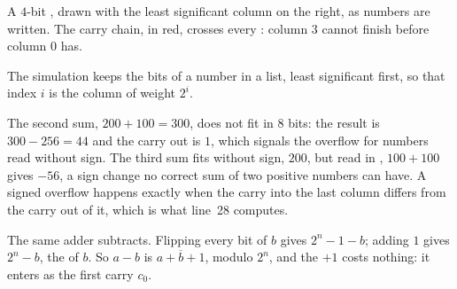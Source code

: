 \begin{omfigure}

{\small A $4$-bit , drawn with the least significant column on the right, as numbers are written.
The carry chain, in red, crosses every : column $3$ cannot finish before column $0$ has.}
\end{omfigure}

The simulation keeps the bits of a number in a list, least significant first, so that index $i$ is the column of
weight $2^i$.

\label{lst:g11:gates-to-arithmetic-unit:ripple}

\label{out:g11:gates-to-arithmetic-unit:ripple}

The second sum, $200 + 100 = 300$, does not fit in $8$ bits: the result is $300 - 256 = 44$ and the carry out is $1$,
which signals the overflow for numbers read without sign. The third sum fits without sign, $200$, but read in , $100 + 100$ gives $-56$, a sign change no correct sum of two positive numbers can have. A signed overflow
happens exactly when the carry into the last column differs from the carry out of it, which is what line~28
computes.

The same adder subtracts. Flipping every bit of $b$ gives $2^n - 1 - b$; adding $1$ gives $2^n - b$, the  of $b$. So $a - b$ is $a + \overline{b} + 1$, modulo $2^n$, and the $+1$ costs nothing: it enters as the
first carry $c_0$.


